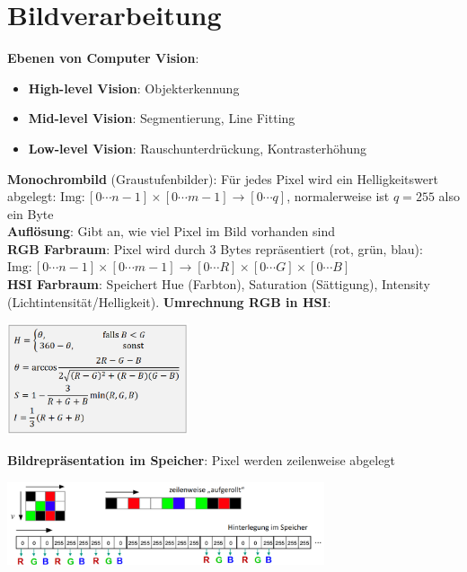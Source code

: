 \section{Bildverarbeitung}

\textbf{Ebenen von Computer Vision}:
\begin{itemize}
	\item \textbf{High-level Vision}: Objekterkennung
	\item \textbf{Mid-level Vision}: Segmentierung, Line Fitting
	\item \textbf{Low-level Vision}: Rauschunterdrückung, Kontrasterhöhung
\end{itemize}
\bigskip
\textbf{Monochrombild} (Graustufenbilder): Für jedes Pixel wird ein Helligkeitswert abgelegt: $\text{Img}\colon [0\cdots n-1]\times [0\cdots m-1]\rightarrow [0\cdots q]$, normalerweise ist $q=255$ also ein Byte\\

\textbf{Auflösung}: Gibt an, wie viel Pixel im Bild vorhanden sind\\

\textbf{RGB Farbraum}: Pixel wird durch 3 Bytes repräsentiert (rot, grün, blau):\\
$\text{Img}\colon [0\cdots n-1]\times [0\cdots m-1]\rightarrow [0\cdots R]\times[0\cdots G]\times [0\cdots B]$\\

\textbf{HSI Farbraum}: Speichert Hue (Farbton), Saturation (Sättigung), Intensity (Lichtintensität/Helligkeit). \textbf{Umrechnung RGB in HSI}:
\begin{center}
	\includegraphics[width=0.4\textwidth]{images/hsi.png}
\end{center}

\textbf{Bildrepräsentation im Speicher}: Pixel werden zeilenweise abgelegt
\begin{center}
	\includegraphics[width=0.7\textwidth]{images/repr.png}
\end{center}

